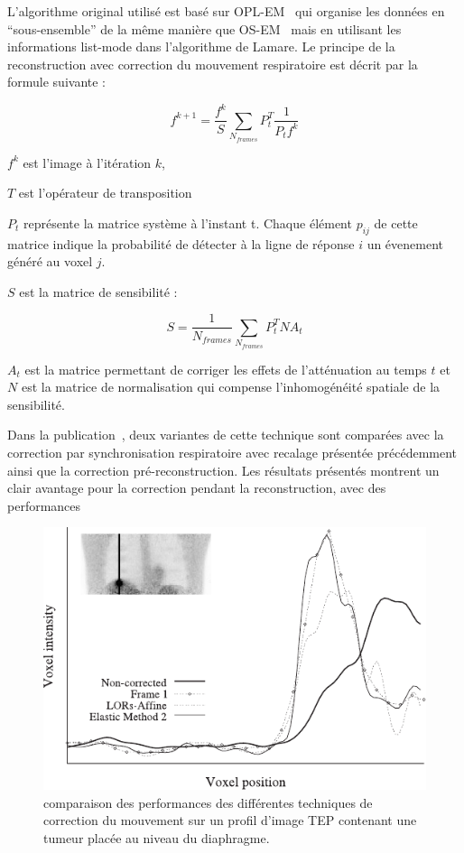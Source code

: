 L'algorithme original utilisé est basé sur OPL-EM~\cite{reader2002one} qui organise les données en ``sous-ensemble'' de la même manière que OS-EM~\cite{hudson1994accelerated} mais en utilisant les informations list-mode dans l'algorithme de Lamare. Le principe de la reconstruction avec correction du mouvement respiratoire est décrit par la formule suivante :

\label{lab:corrMatSyst}
\begin{equation}
 f^{k+1}=\frac{f^k}{S} \sum_{N_{frames}} P_t^T \frac{1}{P_t f^k} 
\end{equation}

$f^k$ est l'image à l'itération $k$,

$T$ est l'opérateur de transposition

$P_t$ représente la matrice système à l'instant t. Chaque élément $p_{ij}$ de cette matrice indique la probabilité de détecter à la ligne de réponse $i$ un évenement généré au voxel $j$. 

$S$ est la matrice de sensibilité :

\begin{equation}
 S=\frac{1}{N_{frames}} \sum_{N_{frames}} P_t^T N A_t 
\end{equation}

 $A_t$ est la matrice permettant de corriger les effets de l'atténuation au temps $t$ et $N$ est la matrice de normalisation qui compense l'inhomogénéité spatiale de la sensibilité.

Dans la publication~\cite{lamare2007list}, deux variantes de cette technique sont comparées avec la correction par synchronisation respiratoire avec recalage présentée précédemment ainsi que la correction pré-reconstruction. Les résultats présentés montrent un clair avantage pour la correction pendant la reconstruction, avec des performances 


\begin{figure}[h!]
	\begin{center}
		\includegraphics[width=12cm]{images/lamare2007list}
	\end{center}
	\caption{comparaison des performances des différentes techniques de correction du mouvement sur un profil d'image TEP contenant une tumeur placée au niveau du diaphragme.} 
	\label{fig:lamare2007}
\end{figure}


